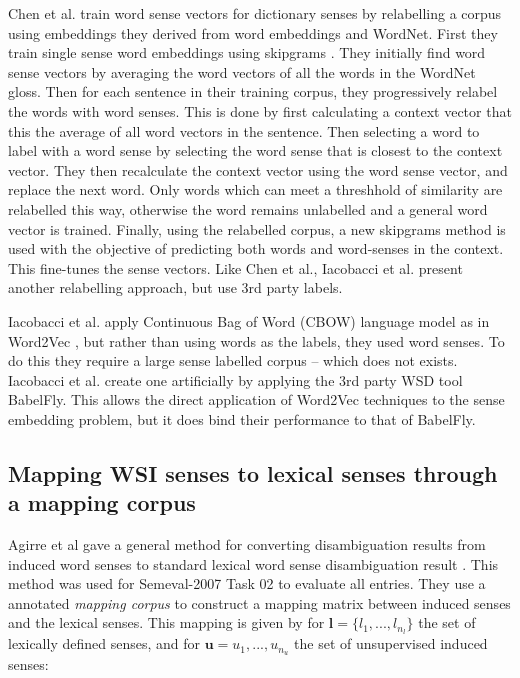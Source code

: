 \documentclass{sig-alternate}
\renewcommand{\l}{\mathbf{l}}
\renewcommand{\u}{\mathbf{u}}
\begin{document}
Chen et al. \parencite{Chen2014} train word sense vectors for dictionary senses by relabelling a corpus using embeddings they derived from word embeddings and WordNet. First they train single sense word embeddings using skipgrams \parencite{mikolov2013efficient}. They initially find word sense vectors by averaging the word vectors of all the words in the WordNet gloss.
Then for each sentence in their training corpus, they progressively relabel the words with word senses. This is done by first calculating a context vector that this the average of all word vectors in the sentence. Then selecting a word to label with a word sense by selecting the word sense that is closest to the context vector. They then recalculate the context vector using the word sense vector, and replace the next word. Only words which can meet a threshhold of similarity are relabelled this way, otherwise the word remains unlabelled and a general word vector is trained.  Finally, using the relabelled corpus, a new skipgrams method is used with the objective of predicting both words and word-senses in the context. This fine-tunes the sense vectors.  Like Chen et al., Iacobacci et al. \parencite{iacobacci2015sensembed} present another relabelling approach, but use 3rd party labels.


Iacobacci et al. \parencite{iacobacci2015sensembed} apply Continuous Bag of Word (CBOW) language model as in Word2Vec , but rather than using words as the labels, they used word senses. To do this they require a large sense labelled corpus -- which does not exists. Iacobacci et al. create one artificially by applying the 3rd party WSD tool BabelFly. This allows the direct application of Word2Vec techniques to the sense embedding problem, but it does bind their performance to that of BabelFly. 


\subsection{Mapping WSI senses to lexical senses through a mapping corpus}


Agirre et al gave a general method for converting disambiguation results from induced word senses to standard lexical word sense disambiguation result \parencite{agirre2006}. This method was used for Semeval-2007 Task 02 \parencite{SemEval2007WSIandWSD} to evaluate all entries.
They use a annotated \emph{mapping corpus} to construct a mapping matrix between induced senses and the lexical senses.
This mapping is given by for $\l=\{l_1,..., l_{n_l}\}$ the set of lexically defined senses, and for $\u={u_1,...,u_{n_u}}$ the set of unsupervised induced senses:
\end{document}
